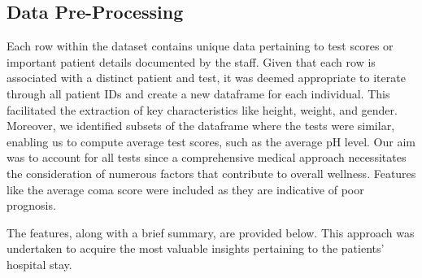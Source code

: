\documentclass{article}
\begin{document}
\subsection{Data Pre-Processing}
\begin{flushleft} 
Each row within the dataset contains unique data pertaining to test scores or important patient details documented by the staff.
Given that each row is associated with a distinct patient and test, it was deemed appropriate to iterate through all patient IDs and create a new dataframe for each individual.
This facilitated the extraction of key characteristics like height, weight, and gender.
Moreover, we identified subsets of the dataframe where the tests were similar, enabling us to compute average test scores, such as the average pH level.
Our aim was to account for all tests since a comprehensive medical approach necessitates the consideration of numerous factors that contribute to overall wellness.
Features like the average coma score were included as they are indicative of poor prognosis.

\clearpage
\noindent
The features, along with a brief summary, are provided below.
This approach was undertaken to acquire the most valuable insights pertaining to the patients' hospital stay.


\end{flushleft}
\end{document}
